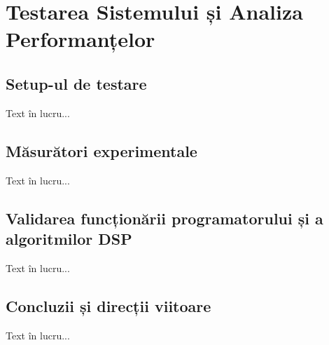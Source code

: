 \chapter{Testarea Sistemului și Analiza Performanțelor \label{testare}}
\section{Setup-ul de testare}
Text în lucru...

\section{Măsurători experimentale}
Text în lucru...

\section{Validarea funcționării programatorului și a algoritmilor DSP}
Text în lucru...

\section{Concluzii și direcții viitoare}
Text în lucru...
